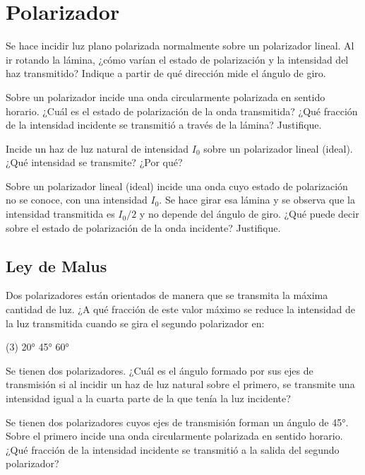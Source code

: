 \section*{Polarizador}

\item Se hace incidir luz plano polarizada normalmente sobre un polarizador lineal.
Al ir rotando la lámina, ¿cómo varían el estado de polarización y la intensidad del haz transmitido? Indique a partir de qué dirección
mide el ángulo de giro.



\item Sobre un polarizador incide una onda circularmente polarizada en sentido horario.
¿Cuál es el estado de polarización de la onda transmitida?
¿Qué fracción de la intensidad incidente se transmitió a través de la lámina?
Justifique.


\item Incide un haz de luz natural de intensidad $I_0$ sobre un polarizador lineal (ideal). ¿Qué intensidad se transmite? ¿Por qué?



\item Sobre un polarizador lineal (ideal) incide una onda cuyo estado de polarización no se conoce, con una intensidad $I_0$.
Se hace girar esa lámina y se observa que la intensidad transmitida es $I_0/2$ y no depende del ángulo de giro.
¿Qué puede decir sobre el estado de polarización de la onda incidente?
Justifique.



\subsection*{Ley de Malus}

\item Dos polarizadores están orientados de manera que se transmita la máxima cantidad de luz.
¿A qué fracción de este valor máximo se reduce la intensidad de la luz transmitida cuando se gira el segundo polarizador en:
\begin{tasks}(3)
	\task \ang{20;;}
	\task \ang{45;;}
	\task \ang{60;;}
\end{tasks}



\item Se tienen dos polarizadores.
¿Cuál es el ángulo formado por sus ejes de transmisión si al incidir un haz de luz natural sobre el primero, se transmite una intensidad igual a la cuarta parte de la que tenía la luz incidente?



\item Se tienen dos polarizadores cuyos ejes de transmisión forman un ángulo de \ang{45;;}.
Sobre el primero incide una onda circularmente polarizada en sentido horario.
¿Qué fracción de la intensidad incidente se transmitió a la salida del segundo polarizador?
